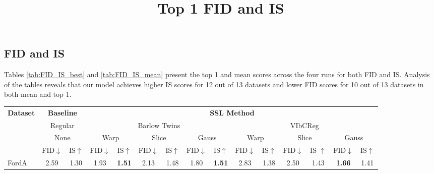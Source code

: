 \documentclass[../../thesis.tex]{subfiles}
\begin{document}
\subsection{FID and IS}

Tables \ref{tab:FID_IS_best} and \ref{tab:FID_IS_mean} present the top 1 and mean scores across the four runs for both FID and IS. Analysis of the tables reveals that our model achieves higher IS scores for 12 out of 13 datasets and lower FID scores for 10 out of 13 datasets in both mean and top 1.\newline

\begin{table}[H]
    \title{Top 1 FID and IS}
    \centering
    \begin{adjustbox}{width=\textwidth}
     \begin{tabular}{lcc|cc|cc|cc|cc|cc|cc} %
        \toprule
        \multirow{4}{*}{\textbf{Dataset}} & \multicolumn{2}{c}{\textbf{Baseline}} & \multicolumn{12}{c}{\textbf{SSL Method}} \\
                                            \cmidrule(lr){2-3} \cmidrule(lr){4-15}
                                          & \multicolumn{2}{c}{Regular}           & \multicolumn{6}{c}{Barlow Twins}                                                 &  \multicolumn{6}{c}{VIbCReg} \\
                                          \cmidrule(lr){2-3} \cmidrule(lr){4-9} \cmidrule(lr){10-15}
                                          &   \multicolumn{2}{c}{None}            & \multicolumn{2}{c}{Warp}  & \multicolumn{2}{c}{Slice} & \multicolumn{2}{c}{Gauss} & \multicolumn{2}{c}{Warp} & \multicolumn{2}{c}{Slice} & \multicolumn{2}{c}{Gauss} \\
                                          \cmidrule(lr){2-3} \cmidrule(lr){4-5} \cmidrule(lr){6-7} \cmidrule(lr){8-9} \cmidrule(lr){10-11} \cmidrule(lr){12-13}\cmidrule(lr){14-15}
                                          & FID$\downarrow$ & IS$\uparrow $                             & FID$\downarrow$ & IS$\uparrow$                  & FID$\downarrow$ & IS$\uparrow$                & FID$\downarrow$ & IS$\uparrow$                 & FID$\downarrow$ & IS$\uparrow$                 & FID$\downarrow$ & IS $\uparrow$                 & FID$\downarrow$ & IS$\uparrow$   \\
        \midrule
        FordA                   & 2.59 & 1.30 & 1.93 & \textbf{1.51} & 2.13 & 1.48 & 1.80 & \textbf{1.51} & 2.83 & 1.38 & 2.50 & 1.43 & \textbf{1.66} & 1.41 \\

\end{tabular}
\end{adjustbox}
\end{table}
\end{document}
